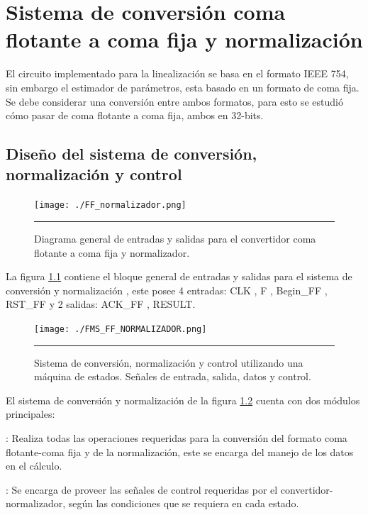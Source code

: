 \chapter{Sistema de conversión coma flotante a coma fija y normalización }
\label{ch:Normalizacion}

El circuito implementado para la linealización se basa en el formato IEEE 754, sin embargo el estimador de parámetros, esta basado en un formato de coma fija. Se debe considerar una conversión entre ambos formatos, para esto se estudió cómo pasar de coma flotante a coma fija, ambos en 32-bits.


\section{Diseño del sistema de conversión, normalización y control}

\begin{figure}[H]
  \centering
    \texttt{[image: ./FF\_normalizador.png]}
    \rule{35em}{0.5pt}
  \caption[Diagrama general de entradas y salidas para el convertidor coma flotante a coma fija y normalizador]{Diagrama general de entradas y salidas para el convertidor coma flotante a coma fija y normalizador.}
  \label{fig:FF-NORM}
\end{figure}


La figura \ref{fig:FF-NORM} contiene el bloque general de entradas y salidas para el sistema de conversión y normalización , este posee 4 entradas: CLK , F , Begin\_FF , RST\_FF y 2 salidas: ACK\_FF , RESULT.

\begin{figure}[H]
  \centering
    \texttt{[image: ./FMS\_FF\_NORMALIZADOR.png]}
    \rule{35em}{0.5pt}
  \caption[Sistema de conversión, normalización y control utilizando una máquina de estados. Señales de entrada, salida, datos y control.]{Sistema de conversión, normalización y control utilizando una máquina de estados. Señales de entrada, salida, datos y control.}
  \label{fig:FMS_FF_NORM}
\end{figure}

El sistema de conversión y normalización de la figura \ref{fig:FMS_FF_NORM} cuenta con dos módulos principales: 

\begin{compactitem}

\item {}: Realiza todas las operaciones requeridas para la conversión del formato coma flotante-coma fija y de la normalización, este se encarga del manejo de los datos en el cálculo. 


\item {}: Se encarga de proveer las señales de control requeridas por el convertidor-normalizador, según las condiciones que se requiera en cada estado.

\end{compactitem}

